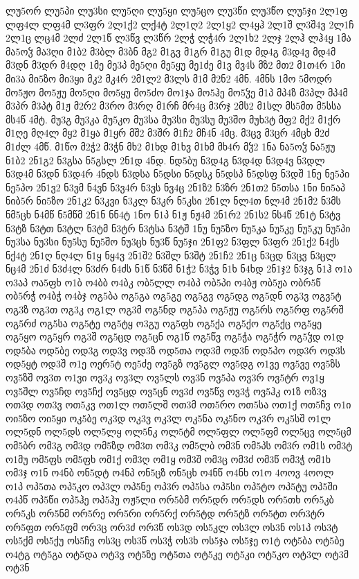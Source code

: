 {ლუ5ორ
ლუ5პი
ლუ3სი
ლუ5ღი
ლუ5ყი
ლუ5ცო
ლუ3წი
ლუ3წო
ლუ5ჯი
2ლ1ფ
ლფ4ლ
ლფ4მ
ლ3ფრ
2ლ1ქ2
ლქ4ტ
2ლ1ღ2
2ლ1ყ2
ლ4ყჰ
2ლ1შ
ლ3შ4ვ
2ლ1ჩ
2ლ1ც
ლც4მ
2ლძ
2ლ1წ
ლ3წვ
ლ3წრ
2ლჭ
ლჭ4რ
2ლ1ხ2
2ლჯ
2ლჰ
ლჰ4ყ
1მა
მა5ოჴ
მა3ღი
მ1ბ2
მ3ბლ
მ3ბნ
მგ2
მ1გვ
მ1გრ
მ1გუ
მ1დ
მდ4გ
მ3დ4ვ
მდ4მ
მ3დნ
მ3დრ
მ4დღ
1მე
მე3პ
მე5ღი
მე5ყუ
მე1ძე
მ1ვ
მვ4ს
მზ2
მთ2
მ1თ4რ
1მი
მი3ა
მი5ზო
მი3ყი
მკ2
მკ4რ
2მ1ლ2
მ3ლს
მ1მ
მ2ნ2
4მნ.
4მნს
1მო
5მოდრ
მო5ჟო
მო5ჟუ
მო5ღი
მო5ყუ
მო5ძო
მო1ჯა
მო5ჰე
მო5ჴე
მ1პ
მპ4ზ
მ3პლ
მპ4მ
მ3პრ
მ3პტ
მ1ჟ
მ2რ2
მ3რო
მ3რღ
მ1რჩ
მრ4ც
მ3რჯ
2მს2
მ1სლ
მს5მთ
მ5სსა
მს4წ
4მტ.
მუ3გ
მუ3კა
მუ5კო
მუ3სა
მუ3სი
მუ3სუ
მუ3შო
მუხ3ტ
მფ2
მქ2
მ1ქრ
მ1ღე
მღ4ლ
მყ2
მ1ყა
მ1ყრ
მშ2
მ3შრ
მ1ჩ2
მჩ4ნ
4მც.
მ3ცვ
მ3ცრ
4მცხ
მ2ძ
მ1ძლ
4მწ.
მ1წო
მ2ჭ2
მ3ჭნ
მხ2
მ1ხდ
მ1ხვ
მ1ხმ
მხ4რ
მჴ2
1ნა
ნა5ოჴ
ნა5ჟუ
ნ1ბ2
2ნ1გ2
ნ3გსა
ნ5გსლ
2ნ1დ
4ნდ.
ნდ5ბუ
ნ3დ4გ
ნ3დ4დ
ნ3დ4ვ
ნ3დლ
ნ3დ4მ
ნ3დნ
ნ3დ4რ
4ნდს
ნ3დსა
ნ5დსი
ნ5დსკ
ნ5დსპ
ნ5დსფ
ნ3დშ
1ნე
ნე5პი
ნე5პო
2ნ1ვ2
ნ3ვმ
ნ4ვნ
ნ3ვ4რ
ნ3ვს
ნვ4ც
2ნ1ზ2
ნ3ზრ
2ნ1თ2
ნ5თსა
1ნი
ნი5აპ
ნიბ5რ
ნი5ზო
2ნ1კ2
ნ3კვი
ნ3კლ
ნ3კრ
ნ5კსი
2ნ1ლ
ნლ4თ
ნლ4მ
2ნ1მ2
ნ3მს
ნმ5ცხ
ნ4მწ
ნ5მწმ
2ნ1ნ
ნნ4ტ
1ნო
ნ1პ
ნ1ჟ
ნჟ4მ
2ნ1რ2
2ნ1ს2
ნს4წ
2ნ1ტ
ნ3ტვ
ნ3ტზ
ნ3ტთ
ნ3ტლ
ნ3ტმ
ნ3ტრ
ნ3ტსა
ნ3ტშ
1ნუ
ნუ5ზო
ნუ5კა
ნუ5კე
ნუ5კუ
ნუ5პი
ნუ3სა
ნუ3სი
ნუ5სუ
ნუ5შო
ნუ3ცხ
ნუ3წ
ნუ5ჯი
2ნ1ფ2
ნ3ფლ
ნ3ფრ
2ნ1ქ2
ნ4ქს
ნქ4ტ
2ნ1ღ
ნღ4ლ
ნ1ყ
ნყ4ვ
2ნ1შ2
ნ3შლ
ნ3შტ
2ნ1ჩ2
2ნ1ც
ნ3ცდ
ნ3ცვ
ნ3ცლ
ნც4მ
2ნ1ძ
ნ3ძ4ლ
ნ3ძრ
ნ4ძს
ნ1წ
ნ3წმ
ნ1ჭ2
ნ3ჭვ
ნ1ხ
ნ4ხდ
2ნ1ჯ2
ნ3ჯგ
ნ1ჰ
ო1ა
ო3აპ
ოა5ფხ
ო1ბ
ო4ბბ
ო4ბკ
ობ5ლლ
ო4ბპ
ობ5პი
ო4ბჟ
ობ5ჟა
ობრ5წ
ობ5რჭ
ო4ბჭ
ო4ბჯ
ოგ5ბა
ოგ5გა
ოგ5გე
ოგ5გვ
ოგ5დგ
ოგ5დნ
ოგ3ვ
ოგვ5ტ
ოგ3ზ
ოგ3თ
ოგ3კ
ოგ1ლ
ოგ3მ
ოგ5ნდ
ოგ5პა
ოგ5ჟუ
ოგ5რს
ოგ5რფ
ოგ5რშ
ოგ5რძ
ოგ5სა
ოგ5ტე
ოგ5ტყ
ო3გუ
ოგ5ფხ
ოგ5ქა
ოგ5ქო
ოგ5ქც
ოგ5ყე
ოგ5ყო
ოგ5ყრ
ოგ3შ
ოგ5ცდ
ოგ5ცნ
ოგ1წ
ოგ5წვ
ოგ5ჭა
ოგ5ჭრ
ოგ5ჴდ
ო1დ
ოდ5ბა
ოდ5ბე
ოდ3გ
ოდ3ვ
ოდ3ზ
ოდ5თა
ოდ3მ
ოდ3ნ
ოდ5პო
ოდ3რ
ოდ3ს
ოდ5ყტ
ოდ3შ
ო1ე
ოერ5ტ
ოე5ძე
ოვ5გზ
ოვ5გლ
ოვ5დგ
ო1ვე
ოვ5ვე
ოვ5ზს
ოვ5ზშ
ოვ3თ
ო1ვი
ოვ3კ
ოვ3ლ
ოვ5ლს
ოვ3ნ
ოვ5პა
ოვ3რ
ოვ5ტრ
ოვ1ყ
ოვ5შლ
ოვ5ჩდ
ოვ5ჩქ
ოვ5ცდ
ოვ5ცნ
ოვ3ძ
ოვ5წვ
ოვ3ჭ
ოვ5ჰკ
ო1ზ
ოზ3ვ
ოთ3დ
ოთ3ვ
ოთ5კვ
ოთ1ლ
ოთ5ლშ
ოთ3მ
ოთ5რო
ოთ5სა
ოთ1ქ
ოთ5ჩვ
ო1ი
ოი5ზო
ოი5ყი
ოკ5ბე
ოკ3დ
ოკ3ვ
ოკ3ლ
ოკ5ნა
ოკ5ნო
ოკ3რ
ოკ5სშ
ო1ლ
ოლ5დნ
ოლ5დს
ოლ5ლყ
ოლ5ნკ
ოლ5ტმ
ოლ5ფლ
ოლ5ფმ
ოლ5ცვ
ოლ5ცმ
ომ5ბრ
ომ3გ
ომ3დ
ომ5ზდ
ომ3თ
ომ3კ
ომ5ლბ
ომ3ნ
ომ5პს
ომ3რ
ომ1ს
ომ3ტ
ო1მუ
ომ5ფს
ომ5ფხ
ომ1ქ
ომ3ღ
ომ1ყ
ომ3შ
ომ3ც
ომ3ძ
ომ3წ
ომ3ჭ
ომ1ხ
ომ3ჯ
ო1ნ
ო4ნბ
ონ5დტ
ო4ნპ
ონ5ცზ
ონ5ცხ
ო4ნწ
ო4ნხ
ო1ო
4ოოვ
4ოოლ
ო1პ
ოპ5თა
ოპ5კო
ოპ3ლ
ოპ5ნე
ოპ3რ
ოპ5სა
ოპ5სი
ოპ5ტო
ოპ5ტუ
ოპ5ში
ო4პწ
ოპ5წი
ოპ5ჰე
ოპ5ჰუ
ოჟ5ლი
ორ5ბმ
ორ5დრ
ორ5დს
ორ5თხ
ორ5კბ
ორ5კს
ორ5ნმ
ორ5რე
ორ5რი
ორ5რქ
ორ5ტდ
ორ5ტზ
ორ5ტთ
ორ3ტრ
ორ5ფთ
ორ5ფმ
ორ3ც
ორ3ძ
ორ3წ
ოს3დ
ოს5კლ
ოს3ლ
ოს3ნ
ოს1პ
ოს3ტ
ოს5ქმ
ოს5ქუ
ოს5ჩვ
ოს3ც
ოს3წ
ოს3ჭ
ოს3ხ
ოს5ჯა
ოს5ჯე
ო1ტ
ოტ5ბა
ოტ5ბე
ო4ტგ
ოტ5გა
ოტ5და
ოტ3ვ
ოტ5ზე
ოტ5თა
ოტ5კე
ოტ5კი
ოტ5კო
ოტ3ლ
ოტ3მ
ოტ3ნ
}
